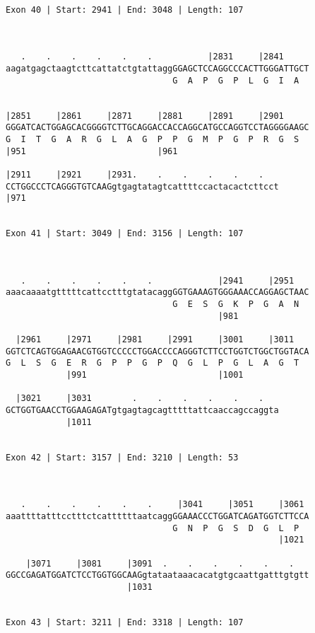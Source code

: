 \documentclass{article}
\begin{document}
\begin{Verbatim}
 
Exon 40 | Start: 2941 | End: 3048 | Length: 107



   .    .    .    .    .    .           |2831     |2841     
aagatgagctaagtcttcattatctgtattaggGGAGCTCCAGGCCCACTTGGGATTGCT
                                 G  A  P  G  P  L  G  I  A  
                                                            
  
|2851     |2861     |2871     |2881     |2891     |2901     
GGGATCACTGGAGCACGGGGTCTTGCAGGACCACCAGGCATGCCAGGTCCTAGGGGAAGC
G  I  T  G  A  R  G  L  A  G  P  P  G  M  P  G  P  R  G  S  
|951                          |961                          
  
|2911     |2921     |2931.    .    .    .    .    .   
CCTGGCCCTCAGGGTGTCAAGgtgagtatagtcattttccactacactcttcct
|971                                                  
  
 
Exon 41 | Start: 3049 | End: 3156 | Length: 107



   .    .    .    .    .    .             |2941     |2951   
aaacaaaatgtttttcattcctttgtatacaggGGTGAAAGTGGGAAACCAGGAGCTAAC
                                 G  E  S  G  K  P  G  A  N  
                                          |981              
  
  |2961     |2971     |2981     |2991     |3001     |3011   
GGTCTCAGTGGAGAACGTGGTCCCCCTGGACCCCAGGGTCTTCCTGGTCTGGCTGGTACA
G  L  S  G  E  R  G  P  P  G  P  Q  G  L  P  G  L  A  G  T  
            |991                          |1001             
  
  |3021     |3031        .    .    .    .    .    .   
GCTGGTGAACCTGGAAGAGATgtgagtagcagtttttattcaaccagccaggta
            |1011                                     
  
 
Exon 42 | Start: 3157 | End: 3210 | Length: 53



   .    .    .    .    .    .     |3041     |3051     |3061 
aaattttatttcctttctcattttttaatcaggGGAAACCCTGGATCAGATGGTCTTCCA
                                 G  N  P  G  S  D  G  L  P  
                                                      |1021 
  
    |3071     |3081     |3091  .    .    .    .    .    .   
GGCCGAGATGGATCTCCTGGTGGCAAGgtataataaacacatgtgcaattgatttgtgtt
                        |1031                               
  
 
Exon 43 | Start: 3211 | End: 3318 | Length: 107




\end{Verbatim}
\end{document}

